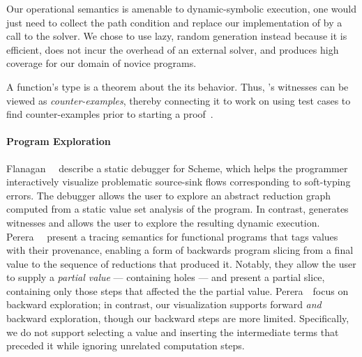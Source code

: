 Our operational semantics is amenable to dynamic-symbolic execution, one
would just need to collect the path condition and replace our
implementation of \gensym by a call to the solver. We chose to use lazy,
random generation instead because it is efficient, does not incur
the overhead of an external solver, and produces high coverage for our
domain of novice programs.

A function's type is a theorem about the its behavior.
Thus, \toolname's witnesses can be viewed as \emph{counter-examples},
thereby connecting it to work on using test cases to find
counter-examples prior to starting a proof~\cite{ACL2Testing, Seidel15}.


\paragraph{Program Exploration}

Flanagan~\etal~ describe a static debugger for Scheme, which helps
the programmer interactively visualize problematic source-sink flows
corresponding to soft-typing errors. The debugger allows the user to explore
an abstract reduction graph computed from a static value set analysis of
the program. In contrast, \toolname generates witnesses and allows the user
to explore the resulting dynamic execution.
%
Perera~\etal~ present a tracing semantics
for functional programs that tags values with their provenance, enabling
a form of backwards program slicing from a final value to the sequence
of reductions that produced it. Notably, they allow the user to supply a
\emph{partial value} --- containing holes --- and present a partial slice,
containing only those steps that affected the the partial value.
Perera~\etal\ focus on backward exploration; in contrast, our
visualization supports forward \emph{and} backward exploration, though
our backward steps are more limited.
%
Specifically, we do not support selecting a value and inserting the
intermediate terms that preceded it while ignoring unrelated computation
steps. %



